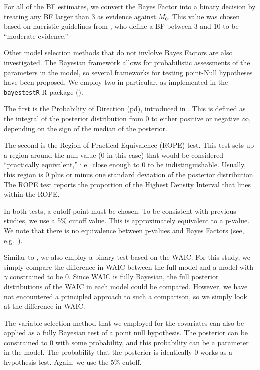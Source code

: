\documentclass[10pt,letterpaper]{article}
\begin{document}
For all of the BF estimates, we convert the Bayes Factor into a binary decision by treating any BF larger than 3 as evidence against $M_0$. This value was chosen based on
hueristic guidelines from \cite{jeffreysTheoryProbability1998}, who
define a BF between 3 and 10 to be ``moderate evidence.''

Other model selection methods that do not invlolve Bayes Factors are
also investigated. The Bayesian framework allows for probabilistic
assessments of the parameters in the model, so several frameworks for
testing point-Null hypotheses have been proposed. We employ two in
particular, as implemented in the \texttt{bayestestR} R package
(\cite{makowskiUnderstandDescribeBayesian2019}).

The first is the Probability of Direction (pd), introduced in
\cite{makowskiIndicesEffectExistence2019}. This is defined as the
integral of the posterior distribution from 0 to either positive or
negative \(\infty\), depending on the sign of the median of the
posterior.

The second is the Region of Practical Equivalence (ROPE) test. This test
sets up a region around the null value (0 in this case) that would be
considered ``practically equivalent,'' i.e.~close enough to 0 to be
indistinguishable. Usually, this region is \(0\) plus or minus one standard
deviation of the posterior distribution. The ROPE test reports the
proportion of the Highest Density Interval that lines within the ROPE.

In both tests, a cutoff point must be chosen. To be consistent with
previous studies, we use a 5\% cutoff value. This is approximately
equivalent to a p-value. We note that there is no equivalence between
p-values and Bayes Factors (see,
e.g.~\cite{lindleyStatisticalParadox1957}).

Similar to \cite{luoPerformancesLOOWAIC2017}, we also employ a binary
test based on the WAIC. For this study, we simply compare the difference
in WAIC between the full model and a model with \(\gamma\) constrained
to be 0. Since WAIC is fully Bayesian, the full posterior distributions
of the WAIC in each model could be compared. However, we have not
encountered a principled approach to such a comparison, so we simply
look at the difference in WAIC.

The variable selection method that we employed for the covariates can
also be applied as a fully Bayesian test of a point null hypothesis. The
posterior can be constrained to 0 with some probability, and this
probability can be a parameter in the model. The probability that the
posterior is identically 0 works as a hypothesis test. Again, we use the
5\% cutoff.
\end{document}
